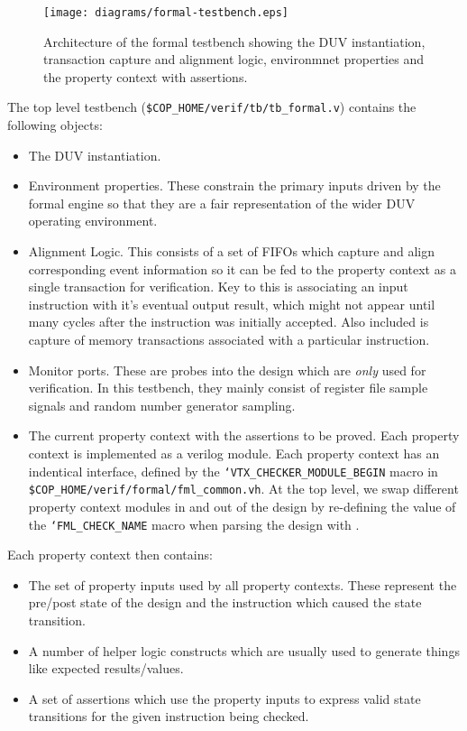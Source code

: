\begin{figure}[h]
\centering
\texttt{[image: diagrams/formal-testbench.eps]}
\caption{Architecture of the formal testbench showing the DUV instantiation,
transaction capture and alignment logic, environmnet properties and
the property context with assertions.}
\label{fig:formal-tb-arch}
\end{figure}

The top level testbench ({\tt \$COP\_HOME/verif/tb/tb\_formal.v}) contains
the following objects:

\begin{itemize}
\item The DUV instantiation.
\item Environment properties.
    These constrain the primary inputs driven by the formal engine so that
    they are a fair representation of the wider DUV operating environment.
\item Alignment Logic.
    This consists of a set of FIFOs which capture and align corresponding
    event information so it can be fed to the property context as a single
    transaction for verification.
    Key to this is associating an input instruction with it's eventual
    output result, which might not appear until many cycles after the
    instruction was initially accepted.
    Also included is capture of memory transactions associated with a
    particular instruction.
\item Monitor ports.
    These are probes into the design which are {\em only} used for
    verification. In this testbench, they mainly consist of register file
    sample signals and random number generator sampling.
\item The current property context with the assertions to be proved.
    Each property context is implemented as a verilog module.
    Each property context has an indentical interface, defined by the
    {\tt `VTX\_CHECKER\_MODULE\_BEGIN}
    macro in
    {\tt \$COP\_HOME/verif/formal/fml\_common.vh}.
    At the top level, we swap different property context modules in and
    out of the design by re-defining the value of the
    {\tt `FML\_CHECK\_NAME}
    macro when parsing the design with \yosys.
\end{itemize}

\noindent
Each property context then contains:

\begin{itemize}
\item The set of property inputs used by all property contexts.
    These represent the pre/post state of the design and the instruction
    which caused the state transition.
\item A number of helper logic constructs which are usually used to generate
    things like expected results/values.
\item A set of assertions which use the property inputs to express valid
    state transitions for the given instruction being checked.
\end{itemize}


